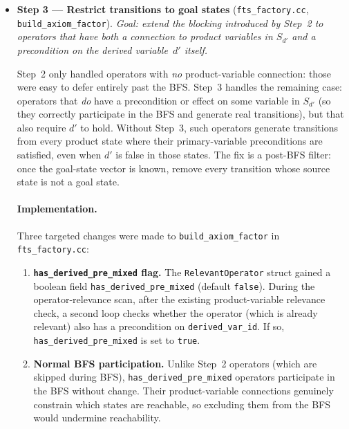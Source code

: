 \documentclass[11pt,a4paper]{article}
\begin{document}
\begin{itemize}
  \item \textbf{Step 3 — Restrict transitions to goal states}
    (\texttt{fts\_factory.cc}, \texttt{build\_axiom\_factor}).
    \emph{Goal: extend the blocking introduced by Step~2 to operators that
    have both a connection to product variables in $S_{d'}$ \emph{and} a
    precondition on the derived variable~$d'$ itself.}

    Step~2 only handled operators with \emph{no} product-variable connection:
    those were easy to defer entirely past the BFS.  Step~3 handles the
    remaining case: operators that \emph{do} have a precondition or effect
    on some variable in $S_{d'}$ (so they correctly participate in the BFS
    and generate real transitions), but that also require $d'$ to hold.
    Without Step~3, such operators generate transitions from every
    product state where their primary-variable preconditions are satisfied,
    even when $d'$ is false in those states.  The fix is a post-BFS
    filter: once the goal-state vector is known, remove every transition
    whose source state is not a goal state.

    \paragraph{Implementation.}
    Three targeted changes were made to \texttt{build\_axiom\_factor} in
    \texttt{fts\_factory.cc}:

    \begin{enumerate}
      \item \textbf{\texttt{has\_derived\_pre\_mixed} flag.}
        The \texttt{RelevantOperator} struct gained a boolean field
        \texttt{has\_derived\_pre\_mixed} (default \texttt{false}).  During
        the operator-relevance scan, after the existing product-variable
        relevance check, a second loop checks whether the operator (which
        is already relevant) also has a precondition on \texttt{derived\_var\_id}.
        If so, \texttt{has\_derived\_pre\_mixed} is set to \texttt{true}.

      \item \textbf{Normal BFS participation.}
        Unlike Step~2 operators (which are skipped during BFS),
        \texttt{has\_derived\_pre\_mixed} operators participate in the BFS
        without change.  Their product-variable connections genuinely
        constrain which states are reachable, so excluding them from the
        BFS would undermine reachability.


\end{enumerate}
\end{itemize}
\end{document}
